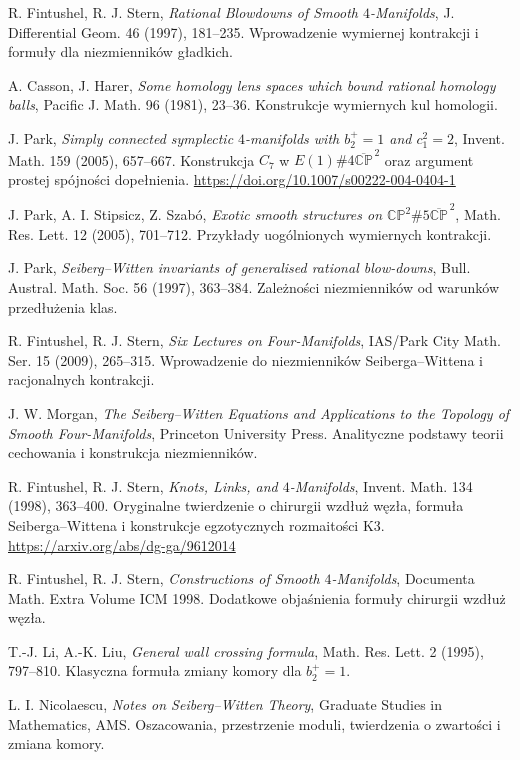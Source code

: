\documentclass[11pt,a4paper]{report}
\numberwithin{equation}{section}
\theoremstyle{plain}
\theoremstyle{definition}
\theoremstyle{remark}
\begin{document}
\begin{enumerate}[label={[\arabic*]},leftmargin=*,itemsep=3pt]
\item R. Fintushel, R. J. Stern, \emph{Rational Blowdowns of Smooth
$4$-Manifolds}, J. Differential Geom. 46 (1997), 181--235.
Wprowadzenie wymiernej kontrakcji i formuły dla niezmienników gładkich.
\item A. Casson, J. Harer, \emph{Some homology lens spaces which bound
rational homology balls}, Pacific J. Math. 96 (1981), 23--36.
Konstrukcje wymiernych kul homologii.
\item J. Park, \emph{Simply connected symplectic $4$-manifolds with $b_2^+=1$ and $c_1^2=2$}, Invent. Math. 159 (2005), 657--667. Konstrukcja $C_7$ w $E(1)\#4\overline{\mathbb{CP}}^{\,2}$ oraz argument prostej spójności dopełnienia. \url{https://doi.org/10.1007/s00222-004-0404-1}
\item J. Park, A. I. Stipsicz, Z. Szabó, \emph{Exotic smooth structures
on $\mathbb{CP}^2\#5\overline{\mathbb{CP}}^{\,2}$},
Math. Res. Lett. 12 (2005), 701--712.
Przykłady uogólnionych wymiernych kontrakcji.
\item J. Park, \emph{Seiberg--Witten invariants of generalised rational
blow-downs}, Bull. Austral. Math. Soc. 56 (1997), 363--384.
Zależności niezmienników od warunków przedłużenia klas.
\item R. Fintushel, R. J. Stern, \emph{Six Lectures on Four-Manifolds},
IAS/Park City Math. Ser. 15 (2009), 265--315.
Wprowadzenie do niezmienników Seiberga--Wittena i racjonalnych kontrakcji.
\item J. W. Morgan, \emph{The Seiberg--Witten Equations and Applications
to the Topology of Smooth Four-Manifolds}, Princeton University Press.
Analityczne podstawy teorii cechowania i konstrukcja niezmienników.
\item R. Fintushel, R. J. Stern, \emph{Knots, Links, and
$4$-Manifolds}, Invent. Math. 134 (1998), 363--400.
Oryginalne twierdzenie o chirurgii wzdłuż węzła, formuła
Seiberga--Wittena i konstrukcje egzotycznych rozmaitości K3.
\url{https://arxiv.org/abs/dg-ga/9612014}
\item R. Fintushel, R. J. Stern, \emph{Constructions of Smooth
$4$-Manifolds}, Documenta Math. Extra Volume ICM 1998.
Dodatkowe objaśnienia formuły chirurgii wzdłuż węzła.
\item T.-J. Li, A.-K. Liu, \emph{General wall crossing formula},
Math. Res. Lett. 2 (1995), 797--810.
Klasyczna formuła zmiany komory dla $b_2^+=1$.
\item L. I. Nicolaescu, \emph{Notes on Seiberg--Witten Theory},
Graduate Studies in Mathematics, AMS. Oszacowania,
przestrzenie moduli, twierdzenia o zwartości i zmiana komory.
\end{enumerate}
\end{document}
